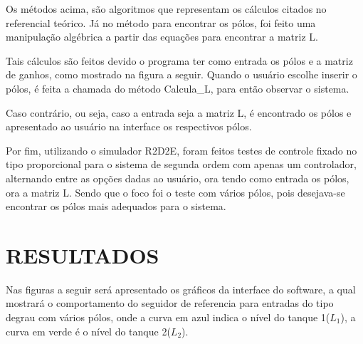 \documentclass[a4paper,12pt]{article}
\begin{document}
\hspace{4ex}Os métodos acima, são algoritmos que representam os cálculos citados no referencial teórico. Já no método para encontrar os pólos, foi feito uma manipulação algébrica a partir das equações para encontrar a matriz L.

\hspace{4ex}Tais cálculos são feitos devido o programa ter como entrada os pólos e a matriz de ganhos, como mostrado na figura a seguir. Quando o usuário escolhe inserir o pólos, é feita a chamada do método Calcula\_L, para então observar o sistema.



\hspace{4ex}Caso contrário, ou seja, caso a entrada seja a matriz L, é encontrado os pólos e apresentado ao usuário na interface os respectivos pólos.

\hspace{4ex}Por fim, utilizando o simulador R2D2E, foram feitos testes de controle fixado no tipo proporcional para o sistema de segunda ordem com apenas um controlador, alternando entre as opções dadas ao usuário, ora tendo como entrada os pólos, ora a matriz L. Sendo que o foco foi o teste com vários pólos, pois desejava-se encontrar os pólos mais adequados para o sistema. 




\newpage


\thispagestyle{main}

\section{RESULTADOS}
\hspace{4ex}Nas figuras a seguir será apresentado os gráficos da interface do software, a qual mostrará o comportamento do seguidor de referencia para entradas do tipo degrau com vários pólos, onde a curva em azul indica o nível do tanque 1($L_1$), a curva em verde é o nível do tanque 2($L_2$).
\end{document}
